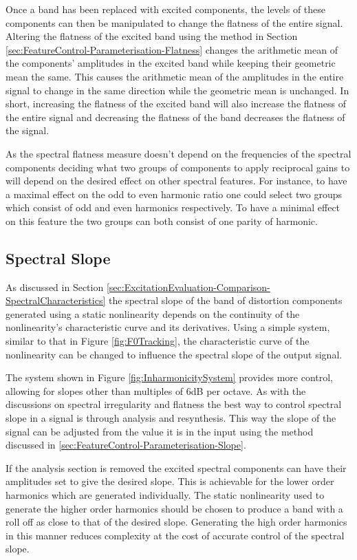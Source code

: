 		Once a band has been replaced with excited components, the levels of these components can then be
		manipulated to change the flatness of the entire signal. Altering the flatness of the excited band using
		the method in Section \ref{sec:FeatureControl-Parameterisation-Flatness} changes the arithmetic mean of the
		components' amplitudes in the excited band while keeping their geometric mean the same. This causes the
		arithmetic mean of the amplitudes in the entire signal to change in the same direction while the geometric
		mean is unchanged. In short, increasing the flatness of the excited band will also increase the flatness of
		the entire signal and decreasing the flatness of the band decreases the flatness of the signal.

		As the spectral flatness measure doesn't depend on the frequencies of the spectral components deciding what
		two groups of components to apply reciprocal gains to will depend on the desired effect on other spectral
		features. For instance, to have a maximal effect on the odd to even harmonic ratio one could select two
		groups which consist of odd and even harmonics respectively. To have a minimal effect on this feature the
		two groups can both consist of one parity of harmonic.

	\subsection{Spectral Slope}
	\label{sec:FeatureControl-Control-Slope}
		As discussed in Section \ref{sec:ExcitationEvaluation-Comparison-SpectralCharacteristics} the spectral
		slope of the band of distortion components generated using a static nonlinearity depends on the continuity
		of the nonlinearity's characteristic curve and its derivatives. Using a simple system, similar to that in
		Figure \ref{fig:F0Tracking}, the characteristic curve of the nonlinearity can be changed to influence the
		spectral slope of the output signal.

		The system shown in Figure \ref{fig:InharmonicitySystem} provides more control, allowing for slopes other
		than multiples of 6dB per octave. As with the discussions on spectral irregularity and flatness the best
		way to control spectral slope in a signal is through analysis and resynthesis. This way the slope of the
		signal can be adjusted from the value it is in the input using the method discussed in
		\ref{sec:FeatureControl-Parameterisation-Slope}.
		
		If the analysis section is removed the excited spectral components can have their amplitudes set to give
		the desired slope. This is achievable for the lower order harmonics which are generated individually.
		The static nonlinearity used to generate the higher order harmonics should be chosen to produce a band with
		a roll off as close to that of the desired slope. Generating the high order harmonics in this manner
		reduces complexity at the cost of accurate control of the spectral slope.
